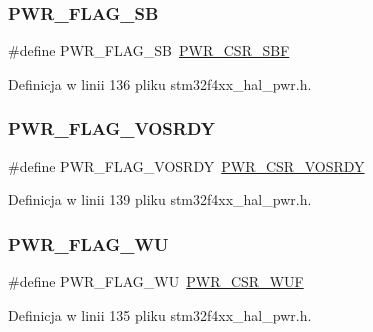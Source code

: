 \subsubsection{\texorpdfstring{P\+W\+R\+\_\+\+F\+L\+A\+G\+\_\+\+SB}{PWR\_FLAG\_SB}}
{\footnotesize\ttfamily \#define P\+W\+R\+\_\+\+F\+L\+A\+G\+\_\+\+SB~\hyperlink{group___peripheral___registers___bits___definition_gab4fd42f153660593cad6f4fe22ff76bb}{P\+W\+R\+\_\+\+C\+S\+R\+\_\+\+S\+BF}}



Definicja w linii 136 pliku stm32f4xx\+\_\+hal\+\_\+pwr.\+h.

\mbox{\label{group___p_w_r___flag_ga7c0f807d7e91750a9bb571ca94dc5f71}} 
\subsubsection{\texorpdfstring{P\+W\+R\+\_\+\+F\+L\+A\+G\+\_\+\+V\+O\+S\+R\+DY}{PWR\_FLAG\_VOSRDY}}
{\footnotesize\ttfamily \#define P\+W\+R\+\_\+\+F\+L\+A\+G\+\_\+\+V\+O\+S\+R\+DY~\hyperlink{group___peripheral___registers___bits___definition_ga4126ed19cce54a5411ff8dd440171695}{P\+W\+R\+\_\+\+C\+S\+R\+\_\+\+V\+O\+S\+R\+DY}}



Definicja w linii 139 pliku stm32f4xx\+\_\+hal\+\_\+pwr.\+h.

\mbox{\label{group___p_w_r___flag_ga2d06760a5769e729b06d41e37036d58e}} 
\subsubsection{\texorpdfstring{P\+W\+R\+\_\+\+F\+L\+A\+G\+\_\+\+WU}{PWR\_FLAG\_WU}}
{\footnotesize\ttfamily \#define P\+W\+R\+\_\+\+F\+L\+A\+G\+\_\+\+WU~\hyperlink{group___peripheral___registers___bits___definition_ga9465bb7ad9ca936688344e2a077539e6}{P\+W\+R\+\_\+\+C\+S\+R\+\_\+\+W\+UF}}



Definicja w linii 135 pliku stm32f4xx\+\_\+hal\+\_\+pwr.\+h.

